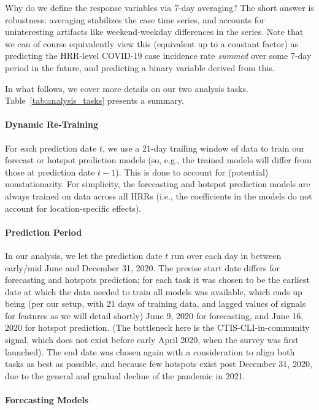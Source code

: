 \documentclass[9pt,twocolumn,twoside,lineno]{pnas-new}
\begin{document}
Why do we define the response variables via 7-day averaging? The short answer 
is robustness: averaging stabilizes the case time series, and accounts for 
uninteresting artifacts like weekend-weekday differences in the series.  Note
that we can of course equivalently view this (equivalent up to a constant
factor) as predicting the HRR-level COVID-19 case incidence rate \textit{summed}
over some 7-day period in the future, and predicting a binary variable derived
from this.  

In what follows, we cover more details on our two analysis
tasks. Table~\ref{tab:analysis_tasks} presents a summary.   

\paragraph{Dynamic Re-Training}

For each prediction date $t$, we use a 21-day trailing window of data to train
our forecast or hotspot prediction models (so, e.g., the trained models will
differ from those at prediction date $t-1$).  This is done to account for
(potential) nonstationarity.  For simplicity, the forecasting and hotspot
prediction models are always trained on data across all HRRs (i.e., the
coefficients in the models do not account for location-specific effects).   

\paragraph{Prediction Period}

In our analysis, we let the prediction date $t$ run over each day in between
early/mid June and December 31, 2020.  The precise start date differs for 
forecasting and hotspots prediction; for each task it was chosen to be the
earliest date at which the data needed to train all models was available, which
ends up being (per our setup, with 21 days of training data, and lagged values
of signals for features as we will detail shortly) June 9, 2020 for forecasting,
and June 16, 2020 for hotspot prediction. (The bottleneck here is the
CTIS-CLI-in-community signal, which does not exist before early April 2020, when
the survey was first launched). The end date was chosen again with a
consideration to align both tasks as best as possible, and because few hotspots
exist post December 31, 2020, due to the general and gradual decline of the
pandemic in 2021.

\paragraph{Forecasting Models}
\end{document}
